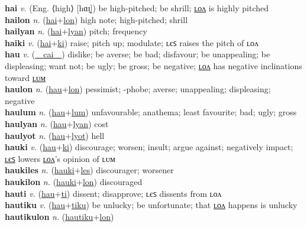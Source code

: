 \textbf{hai} \textit{v.} (Eng. ⟨high⟩ [hɑɪ̯])
be high-pitched; be shrill; \hyperref[hailon]{ʟᴏᴧ} is highly pitched \label{hai} \\
\textbf{hailon} \textit{n.} (\hyperref[hai]{hai}+\hyperref[lon]{lon})
high note; high-pitched; shrill \label{hailon} \\
\textbf{hailyan} \textit{n.} (\hyperref[hai]{hai}+\hyperref[lyan]{lyan})
pitch; frequency \label{hailyan} \\
\textbf{haiki} \textit{v.} (\hyperref[hai]{hai}+\hyperref[ki]{ki})
raise; pitch up; modulate; ʟєꜱ raises the pitch of ʟᴏᴧ \label{haiki} \\
\textbf{hau} \textit{v.} (\hyperref[cai]{~~cai~~})
dislike; be averse; be bad; disfavour; be unappealing; be displeasing; want not; be ugly; be gross; be negative; \hyperref[haulon]{ʟᴏᴧ} has negative inclinations toward \hyperref[haulum]{ʟᴜᴍ} \label{hau} \\
\textbf{haulon} \textit{n.} (\hyperref[hau]{hau}+\hyperref[lon]{lon})
pessimist; -phobe; averse; unappealing; displeasing; negative \label{haulon} \\
\textbf{haulum} \textit{n.} (\hyperref[hau]{hau}+\hyperref[lum]{lum})
unfavourable; anathema; least favourite; bad; ugly; gross \label{haulum} \\
\textbf{haulyan} \textit{n.} (\hyperref[hau]{hau}+\hyperref[lyan]{lyan})
cost \label{haulyan} \\
\textbf{haulyot} \textit{n.} (\hyperref[hau]{hau}+\hyperref[lyot]{lyot})
hell \label{haulyot} \\
\textbf{hauki} \textit{v.} (\hyperref[hau]{hau}+\hyperref[ki]{ki})
discourage; worsen; insult; argue against; negatively impact; \hyperref[haukiles]{ʟєꜱ} lowers \hyperref[haukilon]{ʟᴏᴧ}’s opinion of ʟᴜᴍ \label{hauki} \\
\textbf{haukiles} \textit{n.} (\hyperref[hauki]{hauki}+\hyperref[les]{les})
discourager; worsener \label{haukiles} \\
\textbf{haukilon} \textit{n.} (\hyperref[hauki]{hauki}+\hyperref[lon]{lon})
discouraged \label{haukilon} \\
\textbf{hauti} \textit{v.} (\hyperref[hau]{hau}+\hyperref[ti]{ti})
dissent; disapprove; ʟєꜱ dissents from ʟᴏᴧ \label{hauti} \\
\textbf{hautiku} \textit{v.} (\hyperref[hau]{hau}+\hyperref[tiku]{tiku})
be unlucky; be unfortunate; that \hyperref[hautikulon]{ʟᴏᴧ} happens is unlucky \label{hautiku} \\
\textbf{hautikulon} \textit{n.} (\hyperref[hautiku]{hautiku}+\hyperref[lon]{lon})
